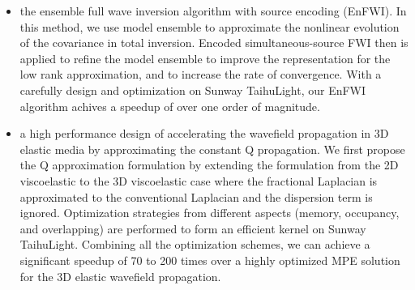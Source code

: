 \begin{eabstract}
\begin{itemize}
  \item the ensemble full wave inversion algorithm with source encoding (EnFWI). In this method, we use model ensemble to approximate the nonlinear evolution of the covariance in total inversion. Encoded simultaneous-source FWI then is applied to refine the model ensemble to improve the representation for the low rank approximation, and to increase the rate of convergence. With a carefully design and optimization on Sunway TaihuLight, our EnFWI algorithm achives a speedup of over one order of magnitude.

  \item a high performance design of accelerating the wavefield propagation in 3D elastic media by approximating the constant Q propagation. We first propose the Q approximation formulation by extending the formulation from the 2D viscoelastic to the 3D viscoelastic case where the fractional Laplacian is approximated to the conventional Laplacian and the dispersion term is ignored. Optimization strategies from different aspects (memory, occupancy, and overlapping) are performed to form an efficient kernel on Sunway TaihuLight. Combining all the optimization schemes, we can achieve a significant speedup of 70 to 200 times over a highly optimized MPE solution for the 3D elastic wavefield propagation.

\end{itemize}

\end{eabstract}

